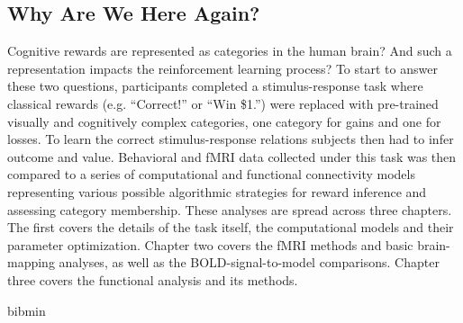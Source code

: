 \documentclass[doc,12pt]{apa}        %
\begin{document}
\subsection{Why Are We Here Again?}
\label{sub:goals}
Cognitive rewards are represented as categories in the human brain?  And such a representation impacts the reinforcement learning process?  To start to answer these two questions, participants completed a stimulus-response task where classical rewards (e.g. ``Correct!'' or ``Win \$1.'') were replaced with pre-trained visually and cognitively complex categories, one category for gains and one for losses.  To learn the correct stimulus-response relations subjects then had to infer outcome and value.   Behavioral and fMRI data collected under this task was then compared to a series of computational and functional connectivity models representing various possible algorithmic strategies for reward inference and assessing category membership.  These analyses are spread across three chapters.  The first covers the details of the task itself, the computational models and their parameter optimization.  Chapter two covers the fMRI methods and basic brain-mapping analyses, as well as the BOLD-signal-to-model comparisons.  Chapter three covers the functional analysis and its methods.

\newpage
 {bibmin}
\end{document}
